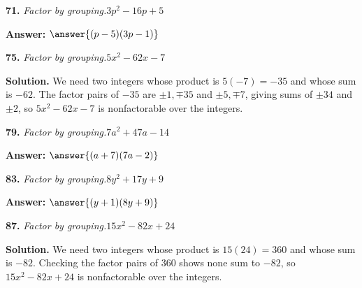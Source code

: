 \documentclass{ximera}
\begin{document}
\begin{problem}
\textbf{71.} \emph{Factor by grouping.}\quad $3p^2 - 16p + 5$

\textbf{Answer:} $\answer{(p -5)(3p -1)}$
\end{problem}

\begin{problem}
\textbf{75.} \emph{Factor by grouping.}\quad $5x^2 - 62x - 7$

\begin{multipleChoice}
\end{multipleChoice}

\begin{hint}
\textbf{Solution.} We need two integers whose product is $5(-7)=-35$ and whose sum is $-62$. The factor pairs of $-35$ are $\pm1,\mp35$ and $\pm5,\mp7$, giving sums of $\pm34$ and $\pm2$, so $5x^2-62x-7$ is nonfactorable over the integers.
\end{hint}
\end{problem}

\begin{problem}
\textbf{79.} \emph{Factor by grouping.}\quad $7a^2 + 47a - 14$

\textbf{Answer:} $\answer{(a +7)(7a -2)}$
\end{problem}

\begin{problem}
\textbf{83.} \emph{Factor by grouping.}\quad $8y^2 + 17y + 9$

\textbf{Answer:} $\answer{(y +1)(8y +9)}$
\end{problem}

\begin{problem}
\textbf{87.} \emph{Factor by grouping.}\quad $15x^2 - 82x + 24$

\begin{multipleChoice}
\end{multipleChoice}

\begin{hint}
\textbf{Solution.} We need two integers whose product is $15(24)=360$ and whose sum is $-82$. Checking the factor pairs of $360$ shows none sum to $-82$, so $15x^2-82x+24$ is nonfactorable over the integers.
\end{hint}
\end{problem}
\end{document}
